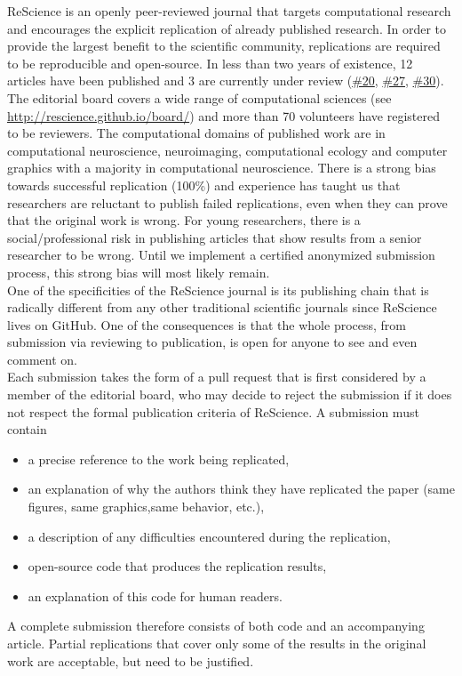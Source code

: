 \documentclass[a4paper,10pt, twocolumn]{article}
\begin{document}
ReScience is an openly peer-reviewed journal that targets computational research
and encourages the explicit replication of already published research. In order
to provide the largest benefit to the scientific community, replications are
required to be reproducible and open-source. In less than two years of existence, 12
articles have been published and 3 are currently under review
(\href{https://github.com/ReScience/ReScience-submission/pull/20}{\#20},
\href{https://github.com/ReScience/ReScience-submission/pull/27}{\#27},
\href{https://github.com/ReScience/ReScience-submission/pull/30}{\#30}). The
editorial board covers a wide range of computational sciences (see
\url{http://rescience.github.io/board/}) and more than 70 volunteers have registered to be reviewers. The computational domains of published work
are in computational neuroscience, neuroimaging, computational ecology and
computer graphics with a majority in computational neuroscience. There is a
strong bias towards successful replication (100\%) and experience has
taught us that researchers are reluctant to publish failed replications, even when they can prove that the original work is wrong. For young researchers,
there is a social/professional risk in publishing articles that show
results from a senior researcher to be wrong. Until we implement a
certified anonymized submission process, this strong bias will most likely
remain.\\

One of the specificities of the ReScience journal is its publishing
chain that is radically different from any other traditional
scientific journals since ReScience lives on GitHub. One of the
consequences is that the whole process, from submission via reviewing
to publication, is open for anyone to see and even comment on.\\

Each submission takes the form of a pull request that is first
considered by a member of the editorial board, who may decide to
reject the submission if it does not respect the formal publication
criteria of ReScience. A submission must contain
\begin{itemize}
\item a precise reference to the work being replicated,
\item an explanation of why the authors think they have replicated the paper
      (same figures, same graphics,same behavior, etc.),
\item a description of any difficulties encountered during the
      replication,
\item open-source code that produces the replication results,
\item an explanation of this code for human readers.
\end{itemize}
A complete submission therefore consists of both code and an accompanying
article. Partial replications that cover only some of the results in the
original work are acceptable, but need to be justified.\\
\end{document}
